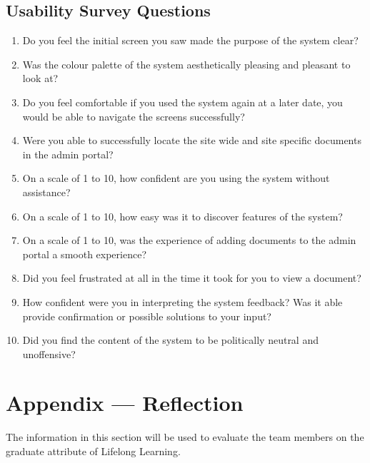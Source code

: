 \documentclass[12pt, titlepage]{article}
\begin{document}
\subsection{Usability Survey Questions}
\begin{enumerate}
  \item Do you feel the initial screen you saw made the purpose of the system clear?
  \item Was the colour palette of the system aesthetically pleasing and pleasant to look at?
  \item Do you feel comfortable if you used the system again at a later date, you would be able to navigate the screens successfully?
  \item Were you able to successfully locate the site wide and site specific documents in the admin portal? 
  \item On a scale of 1 to 10, how confident are you using the system without assistance?
  \item On a scale of 1 to 10, how easy was it to discover features of the system?
  \item On a scale of 1 to 10, was the experience of adding documents to the admin portal a smooth experience?
  \item Did you feel frustrated at all in the time it took for you to view a document?
  \item How confident were you in interpreting the system feedback? Was it able
    provide confirmation or possible solutions to your input?
  \item Did you find the content of the system to be politically neutral and
    unoffensive?
\end{enumerate}

\newpage{}
\section*{Appendix --- Reflection}

The information in this section will be used to evaluate the team members on the
graduate attribute of Lifelong Learning.


\end{document}
